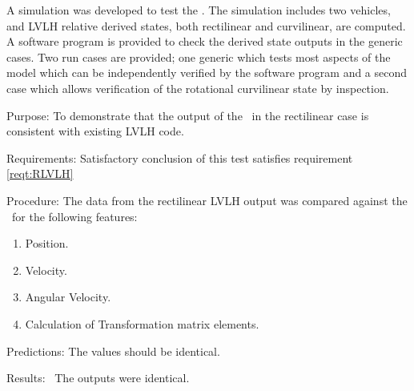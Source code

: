 %
%
%



A simulation was developed to test the \LRDSDesc. The simulation
includes two vehicles, and LVLH relative derived states, both rectilinear and
curvilinear, are computed. A software program is provided to check the derived
state outputs in the generic cases.  Two run cases are
provided; one generic which tests most aspects of the model which can be
independently verified by the software program and a second case which allows
verification of the rotational curvilinear state by inspection.

\label{test:RLVLH}

\begin{description}
\item{Purpose:}\newline
To demonstrate that the output of the \LRDSDesc\ in the rectilinear case is
consistent with existing LVLH code.
\item{Requirements:}\newline
Satisfactory conclusion of this test satisfies requirement \ref{reqt:RLVLH}

\item{Procedure:}\newline
The data from the rectilinear LVLH output was compared against the
\LVLHDesc\ for the following features:
\begin{enumerate}
 \item  {Position.}
 \item  {Velocity.}
 \item  {Angular Velocity.}
 \item {Calculation of Transformation matrix elements.}
\end{enumerate}

\item{Predictions:}
The values should be identical.

\item{Results:}\ \newline
The outputs were identical.
\end{description}

